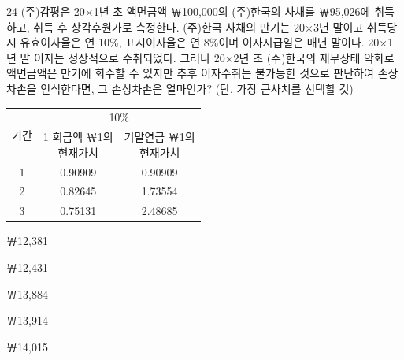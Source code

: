 \begin{question}{24}
(주)감평은 20×1년 초 액면금액 ￦100,000의 (주)한국의 사채를 ￦95,026에 취득하고, 취득 후 상각후원가로 측정한다. (주)한국 사채의 만기는 20×3년 말이고 취득당시 유효이자율은 연 10\%, 표시이자율은 연 8\%이며 이자지급일은 매년 말이다. 20×1년 말 이자는 정상적으로 수취되었다. 그러나 20×2년 초 (주)한국의 재무상태 악화로 액면금액은 만기에 회수할 수 있지만 추후 이자수취는 불가능한 것으로 판단하여 손상차손을 인식한다면, 그 손상차손은 얼마인가? (단, 가장 근사치를 선택할 것)
\begin{center}
\small
\begin{tabular}{|c|c|c|}
\hline
\multirow{2}{*}{기간} & \multicolumn{2}{c|}{10\%} \\
\cline{2-3}
 & \makecell{1 회금액 ￦1의\\현재가치} & \makecell{기말연금 ￦1의\\현재가치} \\
\hline
1 & 0.90909 & 0.90909 \\
\hline
2 & 0.82645 & 1.73554 \\
\hline
3 & 0.75131 & 2.48685 \\
\hline
\end{tabular}
\end{center}
\begin{choices}
  \item ￦12,381
  \item ￦12,431
  \item ￦13,884
  \item ￦13,914
  \item ￦14,015
\end{choices}
\end{question}
